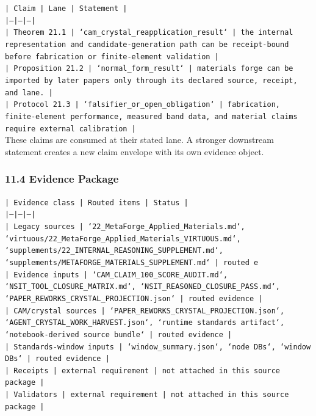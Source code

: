 \documentclass[11pt]{article}
\begin{document}
\noindent\texttt{| Claim | Lane | Statement |}\\
\noindent\texttt{|---|---|---|}\\
\noindent\texttt{| Theorem 21.1 | `cam\_crystal\_reapplication\_result` | the internal representation and candidate-generation path can be receipt-bound before fabrication or finite-element validation |}\\
\noindent\texttt{| Proposition 21.2 | `normal\_form\_result` | materials forge can be imported by later papers only through its declared source, receipt, and lane. |}\\
\noindent\texttt{| Protocol 21.3 | `falsifier\_or\_open\_obligation` | fabrication, finite-element performance, measured band data, and material claims require external calibration |}\\

These claims are consumed at their stated lane. A stronger downstream statement
creates a new claim envelope with its own evidence object.

\subsubsection*{11.4 Evidence Package}

\noindent\texttt{| Evidence class | Routed items | Status |}\\
\noindent\texttt{|---|---|---|}\\
\noindent\texttt{| Legacy sources | `22\_MetaForge\_Applied\_Materials.md`, `virtuous/22\_MetaForge\_Applied\_Materials\_VIRTUOUS.md`, `supplements/22\_INTERNAL\_REASONING\_SUPPLEMENT.md`, `supplements/METAFORGE\_MATERIALS\_SUPPLEMENT.md` | routed e}\\
\noindent\texttt{| Evidence inputs | `CAM\_CLAIM\_100\_SCORE\_AUDIT.md`, `NSIT\_TOOL\_CLOSURE\_MATRIX.md`, `NSIT\_REASONED\_CLOSURE\_PASS.md`, `PAPER\_REWORKS\_CRYSTAL\_PROJECTION.json` | routed evidence |}\\
\noindent\texttt{| CAM/crystal sources | `PAPER\_REWORKS\_CRYSTAL\_PROJECTION.json`, `AGENT\_CRYSTAL\_WORK\_HARVEST.json`, `runtime standards artifact`, `notebook-derived source bundle` | routed evidence |}\\
\noindent\texttt{| Standards-window inputs | `window\_summary.json`, `node DBs`, `window DBs` | routed evidence |}\\
\noindent\texttt{| Receipts | external requirement | not attached in this source package |}\\
\noindent\texttt{| Validators | external requirement | not attached in this source package |}\\
\end{document}
